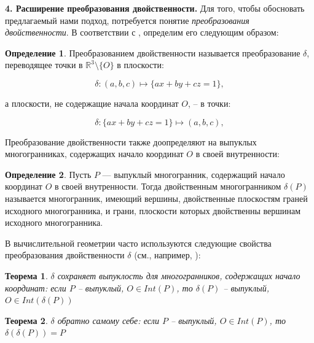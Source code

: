 \documentclass[a4paper, 10pt]{article}
\theoremstyle{definition}
\newtheorem{SmartDefinition}{Определение}
\theoremstyle{plain}
\newtheorem{SmartTheorem}{Теорема}
\theoremstyle{plain}
\begin{document}
\textbf{4. Расширение преобразования двойственности.}
Для того, чтобы обосновать предлагаемый нами подход, потребуется понятие
\textit{преобразования двойственности}. В соответствии с
\cite{Preparata:1985:CGI:4333}, определим его следующим образом:

\begin{SmartDefinition}
 Преобразованием двойственности называется преобразование $\delta$, переводящее
 точки в $\mathbb{R}^{3} \setminus \{O\}$ в плоскости:

 \begin{equation}
  \delta: (a, b, c) \mapsto \{a x + b y + c z = 1\},
 \end{equation}

 а плоскости, не содержащие начала координат $O$, -- в точки:

 \begin{equation}
  \delta: \{a x + b y + c z = 1\} \mapsto (a, b, c),
 \end{equation}
\end{SmartDefinition}

Преобразование двойственности также доопределяют на выпуклых многогранниках,
содержащих начало координат $O$ в своей внутренности:

\begin{SmartDefinition}
 Пусть $P$ --- выпуклый многогранник, содержащий начало координат $O$ в своей
 внутренности. Тогда двойственным многогранником $\delta(P)$ называется
 многогранник, имеющий вершины, двойственные плоскостям граней исходного
 многогранника, и грани, плоскости которых двойственны вершинам исходного
 многогранника.
\end{SmartDefinition}

В вычислительной геометрии часто используются следующие свойства преобразования
двойственности $\delta$ (см., например, \cite{Chazelle:1992:OAI:141741.141749}):

\begin{SmartTheorem}
\label{theorem:automorhism}
 $\delta$ сохраняет выпуклость для многогранников, содержащих начало координат:
 если $P$ -- выпуклый, $O \in Int(P)$, то $\delta(P)$ -- выпуклый,
 $O \in Int(\delta(P))$
\end{SmartTheorem}

\begin{SmartTheorem}
\label{theorem:self-inverse}
 $\delta$ обратно самому себе: если $P$ -- выпуклый, $O \in Int(P)$, то
 $\delta(\delta(P)) = P$
\end{SmartTheorem}
\end{document}
